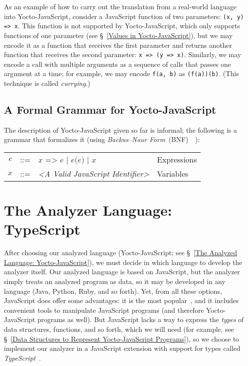 \documentclass[12pt, oneside]{book}
\begin{document}
As an example of how to carry out the translation from a real-world language into Yocto-JavaScript, consider a JavaScript function of two parameters: \texttt{(x, y) => x}. This function is not supported by Yocto-JavaScript, which only supports functions of one parameter (see §~\ref{Values in Yocto-JavaScript}), but we may encode it as a function that receives the first parameter and returns another function that receives the second parameter: \texttt{x => (y => x)}. Similarly, we may encode a call with multiple arguments as a sequence of calls that passes one argument at a time; for example, we may encode \texttt{f(a, b)} as \texttt{(f(a))(b)}. (This technique is called \emph{currying}.)

\subsection{A Formal Grammar for Yocto-JavaScript}
\label{A Formal Grammar for Yocto-JavaScript}

The description of Yocto-JavaScript given so far is informal; the following is a grammar that formalizes it (using \emph{Backus–Naur Form}~(BNF)~\cite{bnf}~\cite[§~4.2]{dragon-book}):

\begin{center}
\begin{tabular}{rcll}
$e$ & ::= & $x\texttt{ => }e$ | $e\texttt{(}e\texttt{)}$ | $x$ & Expressions \\
$x$ & ::= & \emph{<A Valid JavaScript Identifier>} & Variables \\
\end{tabular}
\end{center}

\section{The Analyzer Language: TypeScript}
\label{The Analyzer Language: TypeScript}

After choosing our analyzed language (Yocto-JavaScript; see §~\ref{The Analyzed Language: Yocto-JavaScript}), we must decide in which language to develop the analyzer itself. Our analyzed language is based on JavaScript, but the analyzer simply treats an analyzed program as data, so it may be developed in any language (Java, Python, Ruby, and so forth). Yet, from all these options, JavaScript does offer some advantages: it is the most popular~\cite{stack-overflow-developer-survey, jet-brains-developer-survey}, and it includes convenient tools to manipulate JavaScript programs (and therefore Yocto-JavaScript programs as well). But JavaScript lacks a way to express the \emph{types} of data structures, functions, and so forth, which we will need (for example, see §~\ref{Data Structures to Represent Yocto-JavaScript Programs}), so we choose to implement our analyzer in a JavaScript extension with support for types called \emph{TypeScript}~\cite{typescript, typescript-deep-dive, understanding-typescript}.
\end{document}
